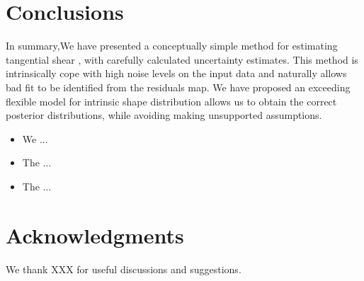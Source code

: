 \documentclass[useAMS,usenatbib]{mn2e}
\begin{document}

\section{Conclusions}
\label{sec:conclusions}

In summary,We have presented a conceptually simple method for estimating tangential shear ,
with carefully calculated uncertainty estimates. This method is intrinsically cope with high noise levels on the input data and naturally
allows bad fit to be identified from the residuals map.
We have proposed an exceeding flexible model for intrinsic shape distribution allows us to obtain the correct posterior distributions,
while avoiding making unsupported assumptions.

\begin{itemize}

\item We ...

\item The ...

\item The ...

\end{itemize}




\section*{Acknowledgments}
 
We thank XXX for useful discussions and suggestions.



% 
% 
% 
% 





%


\label{lastpage}
\bsp
\end{document}

